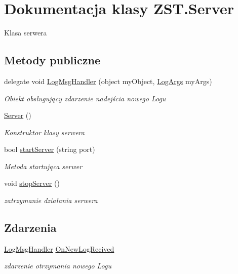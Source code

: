 \hypertarget{class_z_s_t_1_1_server}{}\section{Dokumentacja klasy Z\+S\+T.\+Server}
\label{class_z_s_t_1_1_server}


Klasa serwera  


\subsection*{Metody publiczne}
\begin{DoxyCompactItemize}
\item 
delegate void \hyperlink{class_z_s_t_1_1_server_abaa63d4c934148fd07c8ee4cbb9e278e}{Log\+Msg\+Handler} (object my\+Object, \hyperlink{class_z_s_t_1_1_log_args}{Log\+Args} my\+Args)
\begin{DoxyCompactList}\small\item\em Obiekt obsługujący zdarzenie nadejścia nowego Logu \end{DoxyCompactList}\item 
\hyperlink{class_z_s_t_1_1_server_a377d8cf68ee9d3bbe0ce6ab3c90fba17}{Server} ()
\begin{DoxyCompactList}\small\item\em Konstruktor klasy serwera \end{DoxyCompactList}\item 
bool \hyperlink{class_z_s_t_1_1_server_a3367575ca578e4ece899085f19bd9c09}{start\+Server} (string port)
\begin{DoxyCompactList}\small\item\em Metoda startująca serwer \end{DoxyCompactList}\item 
void \hyperlink{class_z_s_t_1_1_server_aa5e06d4cdb7d5919cbb49a43602d0a7f}{stop\+Server} ()
\begin{DoxyCompactList}\small\item\em zatrzymanie działania serwera \end{DoxyCompactList}\end{DoxyCompactItemize}
\subsection*{Zdarzenia}
\begin{DoxyCompactItemize}
\item 
\hyperlink{class_z_s_t_1_1_server_abaa63d4c934148fd07c8ee4cbb9e278e}{Log\+Msg\+Handler} \hyperlink{class_z_s_t_1_1_server_a1f31932af9efeb93ae403ced7cc28ce4}{On\+New\+Log\+Recived}
\begin{DoxyCompactList}\small\item\em zdarzenie otrzymania nowego Logu \end{DoxyCompactList}\end{DoxyCompactItemize}


